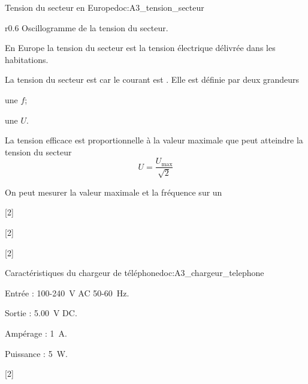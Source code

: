 \begin{doc}{Tension du secteur en Europe}{doc:A3_tension_secteur}
\begin{wrapfigure}[15]{r}{0.6\linewidth}
    Oscillogramme de la tension du secteur.
  \end{wrapfigure}
  
  En Europe la tension du secteur est la tension électrique délivrée dans les habitations.

  La tension du secteur est  car le courant est .
  Elle est définie par deux grandeurs 
  \begin{listePoints}
    \item une  $f$;
    \item une  $U$.
  \end{listePoints}

  La tension efficace est proportionnelle à la valeur maximale que peut atteindre la tension du secteur 
  \begin{equation*}
    U = \dfrac{U_\text{max}}{\sqrt{2}}
  \end{equation*}

  On peut mesurer la valeur maximale et la fréquence sur un 
\end{doc}

[2]

[2]

[2]


\begin{doc}{Caractéristiques du chargeur de téléphone}{doc:A3_chargeur_telephone}
  \begin{listePoints}[2]
    \item Entrée : 100-\qty{240}{\volt} AC 50-\qty{60}{\hertz}.
    \item Sortie : \qty{5,00}{\volt} DC.
    \item Ampérage : \qty{1}{\ampere}.
    \item Puissance : \qty{5}{\watt}.
  \end{listePoints}
\end{doc}

[2]
